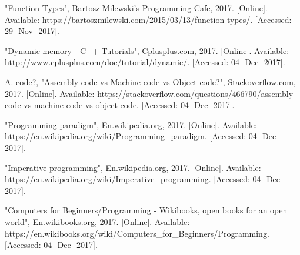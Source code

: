 \documentclass[conference]{IEEEtran}
\begin{document}
\begin{thebibliography}{00}
 "Function Types", Bartosz Milewski's Programming Cafe, 2017. [Online]. Available: https://bartoszmilewski.com/2015/03/13/function-types/. [Accessed: 29- Nov- 2017].

 "Dynamic memory - C++ Tutorials", Cplusplus.com, 2017. [Online]. Available: http://www.cplusplus.com/doc/tutorial/dynamic/. [Accessed: 04- Dec- 2017].

 A. code?, "Assembly code vs Machine code vs Object code?", Stackoverflow.com, 2017. [Online]. Available: https://stackoverflow.com/questions/466790/assembly-code-vs-machine-code-vs-object-code. [Accessed: 04- Dec- 2017].

 "Programming paradigm", En.wikipedia.org, 2017. [Online]. Available: https://en.wikipedia.org/wiki/Programming\_paradigm. [Accessed: 04- Dec- 2017].

 "Imperative programming", En.wikipedia.org, 2017. [Online]. Available: https://en.wikipedia.org/wiki/Imperative\_programming. [Accessed: 04- Dec- 2017].

 "Computers for Beginners/Programming - Wikibooks, open books for an open world", En.wikibooks.org, 2017. [Online]. Available: https://en.wikibooks.org/wiki/Computers\_for\_Beginners/Programming. [Accessed: 04- Dec- 2017].

\end{thebibliography}
\end{document}
